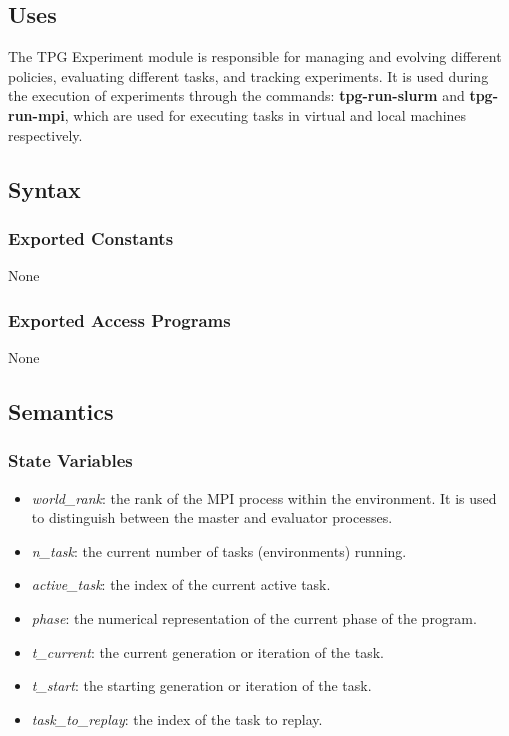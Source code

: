 \documentclass[12pt, titlepage]{article}
\begin{document}
\subsection{Uses}
The TPG Experiment module is responsible for managing and evolving different policies, evaluating different tasks, and tracking experiments. It is used during the execution of experiments through the commands: \textbf{tpg-run-slurm} and \textbf{tpg-run-mpi}, which are used for executing tasks in virtual and local machines respectively.
\subsection{Syntax}

\subsubsection{Exported Constants}
None

\subsubsection{Exported Access Programs}
None

\subsection{Semantics}

\subsubsection{State Variables}
\begin{itemize}
  \item \textit{world\_rank}: the rank of the MPI process within the environment. It is used to distinguish between the master and evaluator processes.
  \item \textit{n\_task}: the current number of tasks (environments) running.
  \item \textit{active\_task}: the index of the current active task.
  \item \textit{phase}: the numerical representation of the current phase of the program.
  \item \textit{t\_current}: the current generation or iteration of the task.
  \item \textit{t\_start}: the starting generation or iteration of the task.
  \item \textit{task\_to\_replay}: the index of the task to replay.
\end{itemize}
\end{document}
